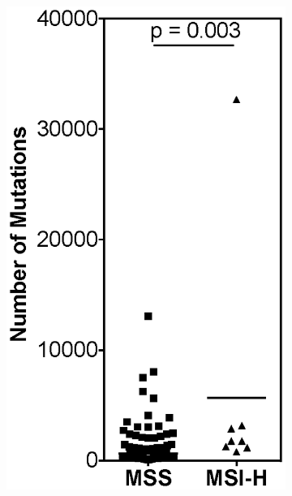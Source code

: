 \begin{figure}[ht]
\begin{subfigure}{0.25\textwidth}
		\caption{}\label{fig:msilandscape:tmb_acc}
	\end{subfigure}%
	\hfill%
	\begin{subfigure}{0.25\textwidth}
		\includegraphics[width=\linewidth,keepaspectratio]{images/msilandscape/tmb_cesc}
		\caption{}\label{fig:msilandscape:tmb_cesc}
	\end{subfigure}%
	\hfill%
	\begin{subfigure}{0.25\textwidth}

\end{subfigure}
\end{figure}
